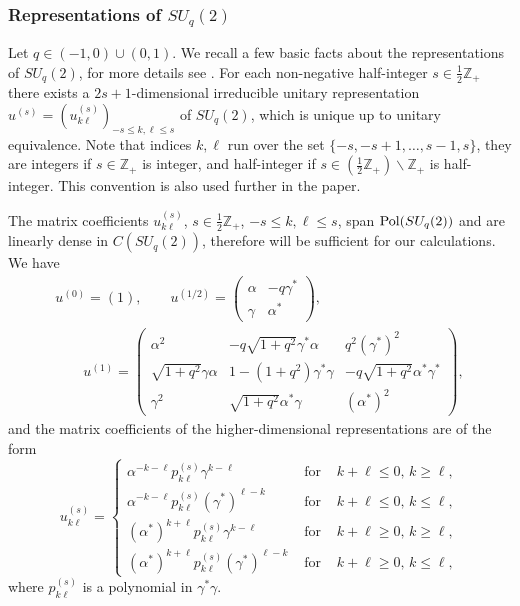 \documentclass[12pt]{amsart}
\theoremstyle{definition}
\theoremstyle{remark}
\numberwithin{equation}{section}
\begin{document}
\subsubsection{Representations of $SU_q(2)$}

Let $q\in(-1,0)\cup(0,1)$. We recall a few basic facts about the representations of $SU_q(2)$, for more details 
see \cite{woronowicz87,woronowicz87b,vaksman+soibelman88,masuda+al88,koornwinder89}. For each non-negative 
half-integer $s\in\frac{1}{2}\mathbb{Z}_+$ there exists a $2s+1$-dimensional irreducible unitary representation 
$u^{(s)}=(u^{(s)}_{k\ell})_{-s\le k,\ell\le s}$ of $SU_q(2)$, which is unique up to unitary equivalence. Note 
that indices $k,\ell$ run over the set $\{-s,-s+1,\ldots,s-1,s\}$, they are integers if $s\in\mathbb{Z}_+$ is 
integer, and half-integer if $s\in(\frac{1}{2}\mathbb{Z}_+)\backslash\mathbb{Z}_+$ is half-integer. This 
convention is also used further in the paper.

The matrix coefficients $u^{(s)}_{k\ell}$, $s\in\frac{1}{2}\mathbb{Z}_+$, $-s\le k,\ell\le s$, span
${\rm Pol} (SU_q(2))$ and are linearly dense in $C(SU_q(2))$, therefore will be sufficient for
our calculations. We have
\begin{gather*}
u^{(0)}= (1), \qquad u^{(1/2)} = \left(\begin{array}{cc} \alpha & -q\gamma^*
    \\ \gamma & \alpha^* \end{array}\right), \\
\qquad u^{(1)} = \left(\begin{array}{ccc} \alpha^2 &
-q\sqrt{1+q^2}\gamma^*\alpha & q^2 (\gamma^*)^2 \\
\sqrt{1+q^2}\gamma\alpha & 1-(1+q^2) \gamma^*\gamma &
-q\sqrt{1+q^2}\alpha^*\gamma^* \\
\gamma^2 & \sqrt{1+q^2} \alpha^*\gamma & (\alpha^*)^2\end{array}\right),
\end{gather*}
and the matrix coefficients of the higher-dimensional representations are of the
form
\[
u^{(s)}_{k\ell}=\left\{\begin{array}{ccl}
\alpha^{-k-\ell}p^{(s)}_{k\ell} \gamma^{k-\ell} & \mbox{ for } & k+\ell\le
0,\, k\ge \ell, \\
\alpha^{-k-\ell}p^{(s)}_{k\ell} (\gamma^*)^{\ell-k} & \mbox{ for } & k+\ell\le
0,\, k\le \ell, \\
(\alpha^*)^{k+\ell}p^{(s)}_{k\ell} \gamma^{k-\ell} & \mbox{ for } & k+\ell\ge
0,\,k\ge \ell, \\
(\alpha^*)^{k+\ell}p^{(s)}_{k\ell} (\gamma^*)^{\ell-k} & \mbox{ for } & k+\ell\ge 0,\, k\le \ell,
\end{array}\right.
\]
where $p^{(s)}_{k\ell}$ is a polynomial in $\gamma^*\gamma$.
\end{document}
